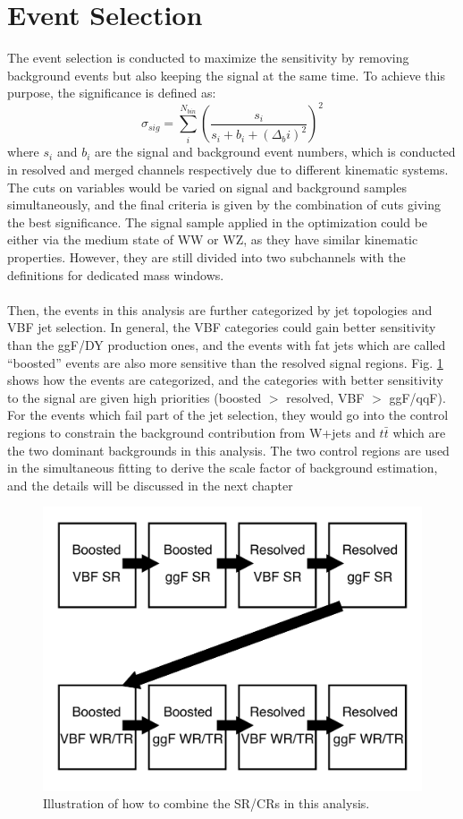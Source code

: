 \section{Event Selection}
The event selection is conducted to maximize the sensitivity by removing background events but also keeping the signal at the same time. To achieve this purpose, the significance is defined as:
\begin{equation}
\label{Eq:significance}
\sigma_{sig} = \displaystyle\sum_{i}^{N_{bin}}( \frac{s_i}{s_i+b_i+(\Delta_bi)^2})^2
\end{equation}
where $s_i$ and $b_i$ are the signal and background event numbers, which is conducted in resolved and merged channels respectively due to different kinematic systems. The cuts on variables would be varied on signal and background samples simultaneously, and the final criteria is given by the combination of cuts giving the best significance. The signal sample applied in the optimization could be either via the medium state of WW or WZ, as they have similar kinematic properties. However, they are still divided into two subchannels with the definitions for dedicated mass windows.  
\\
\\Then, the events in this analysis are further categorized by jet topologies and VBF jet selection. In general, the VBF categories could gain better sensitivity than the ggF/DY production ones, and the events with fat jets which are called ``boosted'' events are also more sensitive than the resolved signal regions. Fig. \ref{Fig:order} shows how the events are categorized, and the categories with better sensitivity to the signal are given high priorities (boosted $>$ resolved, VBF $>$ ggF/qqF). For the events which fail part of the jet selection, they would go into the control regions to constrain the background contribution from W+jets and $t\bar{t}$ which are the two dominant backgrounds in this analysis. The two control regions are used in the simultaneous fitting to derive the scale factor of background estimation, and the details will be discussed in the next chapter
\begin{figure}[h]
	\centering
	\includegraphics[width=0.7\hsize]{Chapter3/order}
	\caption{Illustration of how to combine the SR/CRs in this analysis.}
	\label{Fig:order}
\end{figure}

